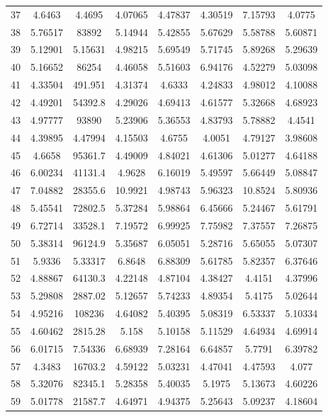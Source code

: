 \begin{center}
\begin{longtable}{cccccccc}
37 & 4.6463 & 4.4695 & 4.07065 & 4.47837 & 4.30519 & 7.15793 & 4.0775\\
38 & 5.76517 & 83892 & 5.14944 & 5.42855 & 5.67629 & 5.58788 & 5.60871\\
39 & 5.12901 & 5.15631 & 4.98215 & 5.69549 & 5.71745 & 5.89268 & 5.29639\\
40 & 5.16652 & 86254 & 4.46058 & 5.51603 & 6.94176 & 4.52279 & 5.03098\\
41 & 4.33504 & 491.951 & 4.31374 & 4.6333 & 4.24833 & 4.98012 & 4.10088\\
42 & 4.49201 & 54392.8 & 4.29026 & 4.69413 & 4.61577 & 5.32668 & 4.68923\\
43 & 4.97777 & 93890 & 5.23906 & 5.36553 & 4.83793 & 5.78882 & 4.4541\\
44 & 4.39895 & 4.47994 & 4.15503 & 4.6755 & 4.0051 & 4.79127 & 3.98608\\
45 & 4.6658 & 95361.7 & 4.49009 & 4.84021 & 4.61306 & 5.01277 & 4.64188\\
46 & 6.00234 & 41131.4 & 4.9628 & 6.16019 & 5.49597 & 5.66449 & 5.08847\\
47 & 7.04882 & 28355.6 & 10.9921 & 4.98743 & 5.96323 & 10.8524 & 5.80936\\
48 & 5.45541 & 72802.5 & 5.37284 & 5.98864 & 6.45666 & 5.24467 & 5.61791\\
49 & 6.72714 & 33528.1 & 7.19572 & 6.99925 & 7.75982 & 7.37557 & 7.26875\\
50 & 5.38314 & 96124.9 & 5.35687 & 6.05051 & 5.28716 & 5.65055 & 5.07307\\
51 & 5.9336 & 5.33317 & 6.8648 & 6.88309 & 5.61785 & 5.82357 & 6.37646\\
52 & 4.88867 & 64130.3 & 4.22148 & 4.87104 & 4.38427 & 4.4151 & 4.37996\\
53 & 5.29808 & 2887.02 & 5.12657 & 5.74233 & 4.89354 & 5.4175 & 5.02644\\
54 & 4.95216 & 108236 & 4.64082 & 5.40395 & 5.08319 & 6.53337 & 5.10334\\
55 & 4.60462 & 2815.28 & 5.158 & 5.10158 & 5.11529 & 4.64934 & 4.69914\\
56 & 6.01715 & 7.54336 & 6.68939 & 7.28164 & 6.64857 & 5.7791 & 6.39782\\
57 & 4.3483 & 16703.2 & 4.59122 & 5.03231 & 4.47041 & 4.47593 & 4.077\\
58 & 5.32076 & 82345.1 & 5.28358 & 5.40035 & 5.1975 & 5.13673 & 4.60226\\
59 & 5.01778 & 21587.7 & 4.64971 & 4.94375 & 5.25643 & 5.09237 & 4.18604\\

\end{longtable}
\end{center}
